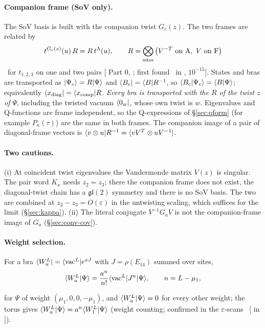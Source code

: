 \paragraph{Companion frame (SoV only).} The SoV basis is built with the companion twist $G_c(z)$. The two frames are
related by
\begin{equation}
 t^{G_c(z)}(u)\,R=R\,t^{\Lambda}(u),\qquad R=\bigotimes_{\rm sites}\big(V^{-T}\ \text{on A},\ V\ \text{on F}\big)
\end{equation}
\ex\ for $t_{1,2,3}$ on one and two pairs [ Part 0, ; first found \npy\
in , $10^{-15}$]. States and bras are transported as $|\Psi_c\rangle=R|\Psi\rangle$ and
$\langle B_c|=\langle B|R^{-1}$, so $\langle B_c|\Psi_c\rangle=\langle B|\Psi\rangle$; equivalently $\langle x_{\rm diag}|=\langle x_{\rm comp}|R$.
\emph{Every bra is transported with the $R$ of the twist $z$ of $\Psi$}, including the twisted vacuum $\langle0_w|$, whose own
twist is $w$. Eigenvalues and Q-functions are frame independent, so the Q-expressions of \S\ref{sec:qform} (for example
$P_\kappa(\tau)$) are the same in both frames. The companion image of a pair of diagonal-frame vectors is
$\langle v\otimes u|R^{-1}=\langle vV^T\otimes uV^{-1}|$.

\paragraph{Two cautions.} (i) At coincident twist eigenvalues the Vandermonde matrix $V(z)$ is singular. The pair word
$K_\kappa$ needs $z_2=z_3$; there the companion frame does not exist, the diagonal-twist chain has a $\mathfrak{gl}(2)$
symmetry and there is no SoV basis. The two are combined at $z_2-z_3=O(\varepsilon)$ in the untwisting scaling, which
suffices for the limit (\S\ref{sec:kappa}). (ii) The literal conjugate $V^{-1}G_aV$ is not the companion-frame image of
$G_a$ (\S\ref{sec:conv-cov}).

\paragraph{Weight selection.} For a bra $\langle W_a^L|=\langle\mathrm{vac}^L|e^{aJ}$ with $J=\rho(E_{14})$ summed over sites,
\begin{equation}
 \langle W_a^L|\Psi\rangle=\frac{a^n}{n!}\langle\mathrm{vac}^L|J^n|\Psi\rangle,\qquad n=L-\mu_1,
\end{equation}
{\raggedright for $\Psi$ of weight $(\mu_1,0,0,-\mu_1)$, and $\langle W_a^L|\Psi\rangle=0$ for every other weight; the torus gives
$\langle W_a^L|\Psi\rangle=a^n\langle W_1^L|\Psi\rangle$ (weight counting; confirmed in the $\varepsilon$-scans \npy\
[\nb{scan\_eps.py} in ]).\par}


